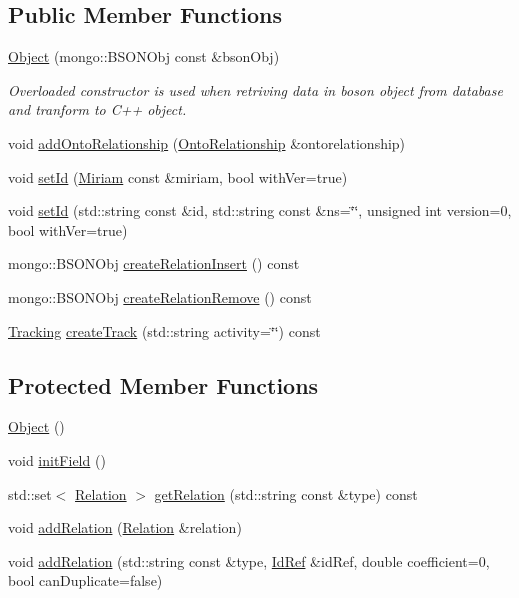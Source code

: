 \subsection*{Public Member Functions}
\begin{DoxyCompactItemize}
\item 
\hyperlink{classunisys_1_1Object_a566e4bbdf791d288e5483e646c3fadae}{Object} (mongo\-::\-B\-S\-O\-N\-Obj const \&bson\-Obj)
\begin{DoxyCompactList}\small\item\em Overloaded constructor is used when retriving data in boson object from database and tranform to C++ object. \end{DoxyCompactList}\item 
void \hyperlink{classunisys_1_1Object_a5af1b3d185e94dbcbc62c34d7dc5516f}{add\-Onto\-Relationship} (\hyperlink{classunisys_1_1OntoRelationship}{Onto\-Relationship} \&ontorelationship)
\item 
void \hyperlink{classunisys_1_1Object_ac29c9fc5b7114526d02d33d44a8dd1c9}{set\-Id} (\hyperlink{classunisys_1_1Miriam}{Miriam} const \&miriam, bool with\-Ver=true)
\item 
void \hyperlink{classunisys_1_1Object_af00397d8ada6998226a3bd1bfdbd7e9c}{set\-Id} (std\-::string const \&id, std\-::string const \&ns=\char`\"{}\char`\"{}, unsigned int version=0, bool with\-Ver=true)
\item 
mongo\-::\-B\-S\-O\-N\-Obj \hyperlink{classunisys_1_1Object_ace7445c1a361ffecc3e8947ee4ed91cf}{create\-Relation\-Insert} () const 
\item 
mongo\-::\-B\-S\-O\-N\-Obj \hyperlink{classunisys_1_1Object_a49b902ac376cdf8837c188dac46b17d4}{create\-Relation\-Remove} () const 
\item 
\hyperlink{classunisys_1_1Tracking}{Tracking} \hyperlink{classunisys_1_1Object_a0ebbb54b1f9fd33ee57ae86abef3ec4f}{create\-Track} (std\-::string activity=\char`\"{}\char`\"{}) const 
\end{DoxyCompactItemize}
\subsection*{Protected Member Functions}
\begin{DoxyCompactItemize}
\item 
\hyperlink{classunisys_1_1Object_a9df6b35da942f0dbade9832aef618f2e}{Object} ()
\item 
void \hyperlink{classunisys_1_1Object_ad0a4afaf978d2cca8a6a27506f06138c}{init\-Field} ()
\item 
std\-::set$<$ \hyperlink{classunisys_1_1Relation}{Relation} $>$ \hyperlink{classunisys_1_1Object_aeec299bc2de7dac9f5d61a96ca46cdf0}{get\-Relation} (std\-::string const \&type) const 
\item 
void \hyperlink{classunisys_1_1Object_a1b9e2f4225e0fb73ddea29b12c59068b}{add\-Relation} (\hyperlink{classunisys_1_1Relation}{Relation} \&relation)
\item 
void \hyperlink{classunisys_1_1Object_a9e3cfeb96f792a992d53eddcaef7d699}{add\-Relation} (std\-::string const \&type, \hyperlink{classunisys_1_1IdRef}{Id\-Ref} \&id\-Ref, double coefficient=0, bool can\-Duplicate=false)
\end{DoxyCompactItemize}
